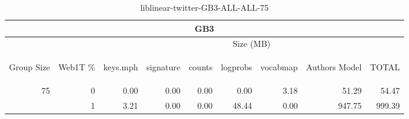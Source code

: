 \begin{center}
\begin{table}[htbp] 
 \begin{center}
\begin{tabular}{ | r | r | r | r | r | r | r | r | r |}
\hline
\multicolumn{9}{|c|}{GB3}\\
\hline
 & & \multicolumn{7}{|c|}{Size (MB)}\\ \cline{3-9}
\begin{sideways}Group Size\end{sideways} & \begin{sideways}Web1T \% \end{sideways} & \begin{sideways}keys.mph\end{sideways} & \begin{sideways}signature\end{sideways} & \begin{sideways}counts\end{sideways} & \begin{sideways}logprobs\end{sideways} & \begin{sideways}vocabmap\end{sideways} & \begin{sideways}Authors Model \end{sideways} & \begin{sideways}TOTAL\end{sideways}\\
\hline
\multirow{1}{*}{75}
 & 0 & 0.00 & 0.00 & 0.00 & 0.00 & 3.18 & 51.29 & 54.47\\ \cline{2-9}
 & 1 & 3.21 & 0.00 & 0.00 & 48.44 & 0.00 & 947.75 & 999.39\\ \cline{2-9}
\hline
\end{tabular}
\caption{liblinear-twitter-GB3-ALL-ALL-75}
\label{table:liblinear-twitter-GB3-ALL-ALL-75}
\end{center}
 \end{table}
\end{center}

